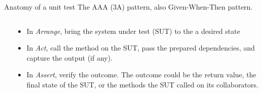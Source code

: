 \documentclass[english,handout,10pt,aspectratio=169,t]{beamer}
\begin{document}
\begin{frame}{Anatomy of a unit test}
  The AAA (3A) pattern, also Given-When-Then pattern.

  \begin{columns}[T]
    \begin{column}[]{0.5\textwidth}
      \begin{minipage}{\linewidth}
        \aaapattern
      \end{minipage}
    \end{column}
    \begin{column}[]{0.5\textwidth}
      \begin{itemize}
        \item In \textit{Arrange}, bring the system under test (SUT) to the a
        desired state
        \item In \textit{Act}, call the method on the SUT, pass the prepared
        dependencies, and capture the output (if any).
        \item In \textit{Assert}, verify the outcome. The outcome could be the
        return value, the final state of the SUT, or the methods the SUT called
        on its collaborators.
      \end{itemize}
    \end{column}
  \end{columns}
\end{frame}
\end{document}
